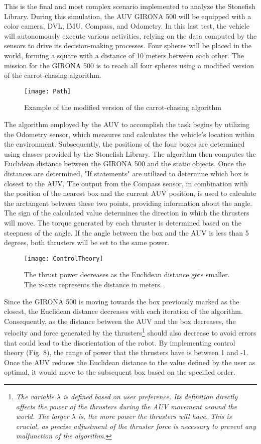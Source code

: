 \documentclass[]{article}
\begin{document}
	This is the final and most complex scenario implemented to analyze the Stonefish Library. During this simulation, the AUV GIRONA 500 will be equipped with a color camera, DVL, IMU, Compass, and Odometry. In this last test, the vehicle will autonomously execute various activities,  relying on the data computed by the sensors to drive its decision-making processes. Four spheres will be placed in the world, forming a square with a distance of 10 meters between each other. The mission for the GIRONA 500 is to reach all four spheres using a modified version of the carrot-chasing algorithm.
	
	\begin{figure}[h]
		\centering
		\texttt{[image: Path]}
		\caption{Example of the modified version of the carrot-chasing algorithm}
	\end{figure}
	
	
	The algorithm employed by the AUV to accomplish the task begins by utilizing the Odometry sensor, which measures and calculates the vehicle's location within the environment. Subsequently, the positions of the four boxes are determined using classes provided by the Stonefish Library. The algorithm then computes the Euclidean distance between the GIRONA 500 and the static objects. Once the distances are determined, "If statements" are utilized to determine which box is closest to the AUV. The output from the Compass sensor, in combination with the position of the nearest box and the current AUV position, is used to calculate the arctangent between these two points, providing information about the angle. The sign of the calculated value determines the direction in which the thrusters will move. The torque generated by each thruster is determined based on the steepness of the angle. If the angle between the box and the AUV is less than 5 degrees, both thrusters will be set to the same power.
	
	\begin{figure}[h]
		\centering
		\texttt{[image: ControlTheory]}
		\caption{The thrust power decreases as the Euclidean distance gets smaller. The x-axis represents the distance in meters.}
	\end{figure}
	
	Since the GIRONA 500 is moving towards the box previously marked as the closest, the Euclidean distance decreases with each iteration of the algorithm. Consequently, as the distance between the AUV and the box decreases, the velocity and force generated by the thrusters\footnote[7]{\textit{The variable $\lambda$ is defined based on user preference.  Its definition directly affects the power of the thrusters during the AUV movement around the world. The larger $\lambda$ is, the more power the thrusters will have. This is crucial, as precise adjustment of the thruster force is necessary to prevent any malfunction of the algorithm.}} should also decrease to avoid errors that could lead to the disorientation of the robot. By implementing control theory (Fig. 8), the range of power that the thrusters have is between 1 and -1. Once the AUV reduces the Euclidean distance to the value defined by the user as optimal, it would move to the subsequent box based on the specified order.
	
\end{document}
